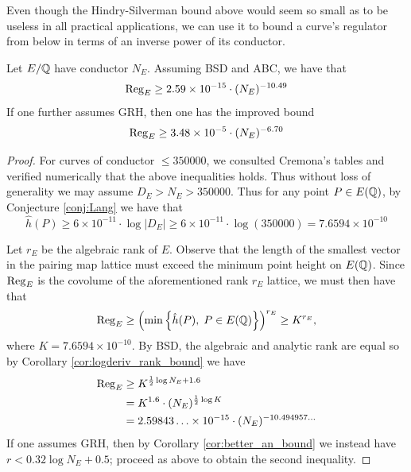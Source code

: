 Even though the Hindry-Silverman bound above would seem so small as to be useless in all practical applications, we can use it to bound a curve's regulator from below in terms of an inverse power of its conductor.
\begin{theorem}\label{thm:regulator_lower_bound}
Let $E/\mathbb{Q}$ have conductor $N_E$. Assuming BSD and ABC, we have that
\begin{equation}
\operatorname{Reg}_E \ge 2.59 \times 10^{-15} \cdot (N_E)^{-10.49}
\end{equation}
If one further assumes GRH, then one has the improved bound
\begin{equation}
\operatorname{Reg}_E \ge 3.48 \times 10^{-5} \cdot (N_E)^{-6.70}
\end{equation}
\end{theorem}
\begin{proof}
For curves of conductor $\le 350000$, we consulted Cremona's tables and verified numerically that the above inequalities holds. Thus without loss of generality we may assume $D_E > N_E > 350000$. Thus for any point $P \in E(\mathbb{Q})$, by Conjecture \ref{conj:Lang} we have that
\begin{equation}
\hat{h}(P) \ge 6\times10^{-11} \cdot \log |D_E| \ge 6\times10^{-11} \cdot \log(350000) = 7.6594 \times 10^{-10}
\end{equation}

Let $r_E$ be the algebraic rank of $E$. Observe that the length of the smallest vector in the pairing map lattice must exceed the minimum point height on $E(\mathbb{Q})$. Since $\operatorname{Reg}_E$ is the covolume of the aforementioned rank $r_E$ lattice, we must then have that
\begin{equation*}
\operatorname{Reg}_E \ge \left(\min \left\{ \hat{h}(P), \; P \in E(\mathbb{Q})\right\}\right)^{r_E} \ge  K^{r_E},
\end{equation*}
where $K = 7.6594 \times 10^{-10}$. By BSD, the algebraic and analytic rank are equal so by Corollary \ref{cor:logderiv_rank_bound} we have
\begin{align*}
\operatorname{Reg}_E &\ge K^{\frac{1}{2} \log N_E + 1.6} \\
&= K^{1.6} \cdot (N_E)^{\frac{1}{2} \log K} \\
&= 2.59843\ldots \times 10^{-15} \cdot (N_E)^{-10.494957\ldots}
\end{align*}
If one assumes GRH, then by Corollary \ref{cor:better_an_bound} we instead have $r < 0.32 \log N_E + 0.5$; proceed as above to obtain the second inequality.
\end{proof}


